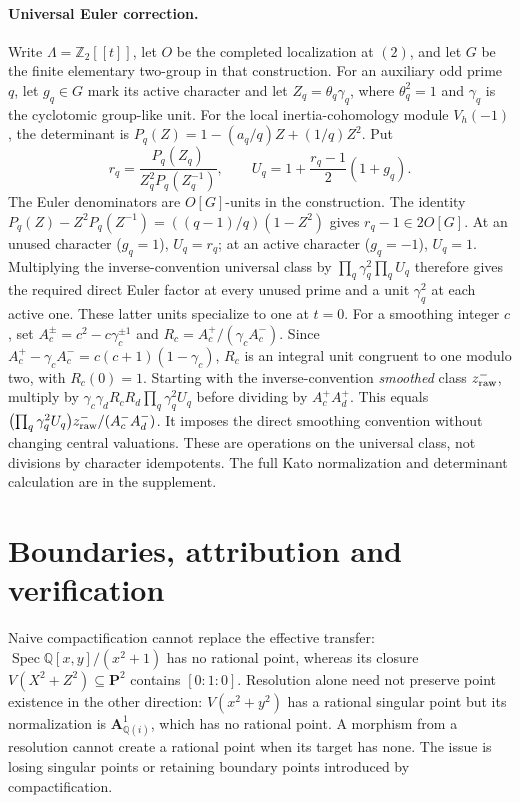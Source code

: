 \documentclass[11pt]{article}
\newcommand{\Q}{\mathbb Q}
\newcommand{\Z}{\mathbb Z}
\begin{document}
\paragraph{Universal Euler correction.}
Write $\Lambda=\Z_2[[t]]$, let $O$ be the completed localization at $(2)$,
and let $G$ be the finite elementary two-group in that construction.
For an auxiliary odd prime $q$, let $g_q\in G$ mark its active character
and let $Z_q=\theta_q\gamma_q$, where $\theta_q^2=1$ and $\gamma_q$ is
the cyclotomic group-like unit. For the local inertia-cohomology module
$V_h(-1)$, the determinant is
$P_q(Z)=1-(a_q/q)Z+(1/q)Z^2$. Put
\[
 r_q=\frac{P_q(Z_q)}{Z_q^2P_q(Z_q^{-1})},\qquad
 U_q=1+\frac{r_q-1}{2}(1+g_q).
\]
The Euler denominators are $O[G]$-units in the construction.
The identity $P_q(Z)-Z^2P_q(Z^{-1})=((q-1)/q)(1-Z^2)$ gives
$r_q-1\in2O[G]$. At an unused character ($g_q=1$), $U_q=r_q$;
at an active character ($g_q=-1$), $U_q=1$.
Multiplying the inverse-convention universal class by
$\prod_q\gamma_q^2\prod_qU_q$ therefore gives the required direct Euler
factor at every unused prime and a unit $\gamma_q^2$ at each active one.
These latter units specialize to one at $t=0$.
For a smoothing integer $c$, set
$A_c^{\pm}=c^2-c\gamma_c^{\pm1}$ and
$R_c=A_c^+/(\gamma_cA_c^-)$.
Since $A_c^+-\gamma_cA_c^-=c(c+1)(1-\gamma_c)$,
$R_c$ is an integral unit congruent to one modulo two, with $R_c(0)=1$.
Starting with the inverse-convention \emph{smoothed} class $z_{\rm raw}^-$,
multiply by $\gamma_c\gamma_dR_cR_d\prod_q\gamma_q^2U_q$ before dividing
by $A_c^+A_d^+$. This equals
$\bigl(\prod_q\gamma_q^2U_q\bigr)z_{\rm raw}^-/(A_c^-A_d^-)$.
It imposes the direct smoothing convention without changing central
valuations. These are operations on the universal class, not divisions
by character idempotents. The full Kato normalization and determinant
calculation are in the supplement.

\section{Boundaries, attribution and verification}
Naive compactification cannot replace the effective transfer:
$\operatorname{Spec}\Q[x,y]/(x^2+1)$ has no rational point, whereas
its closure $V(X^2+Z^2)\subseteq\mathbf P^2$ contains $[0:1:0]$.
Resolution alone need not preserve point existence in the other direction:
$V(x^2+y^2)$ has a rational singular point but its normalization is
$\mathbf A^1_{\Q(i)}$, which has no rational point. A morphism from a
resolution cannot create a rational point when its target has none.
The issue is losing singular points or retaining boundary points introduced
by compactification.
\end{document}
